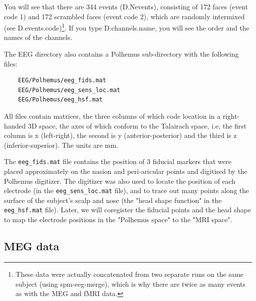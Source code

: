 You will see that there are 344 events (D.Nevents), consisting of 172 faces (event code 1) and 172 scrambled faces (event code 2), which are randomly intermixed (see D.events.code)\footnote{These data were actually concatenated from two separate runs on the same subject (using spm-eeg-merge), which is why there are twice as many events as with the MEG and fMRI data.}. If you type D.channels.name, you will see the order and the names of the channels.

The EEG directory also contains a Polhemus sub-directory with the following files:
\begin{verbatim}
	EEG/Polhemus/eeg_fids.mat
	EEG/Polhemus/eeg_sens_loc.mat
	EEG/Polhemus/eeg_hsf.mat
\end{verbatim}
All files contain matrices, the three columns of which code location in a right-handed 3D space, the axes of which conform to the Talairach space, i.e, the first column is x (left-right), the second is y (anterior-posterior) and the third is z (inferior-superior). The units are mm.

The \verb!eeg_fids.mat! file contains the position of 3 fiducial markers that were placed approximately on the nasion and peri-aricular points and digitised by the Polhemus digitizer. The digitizer was also used to locate the position of each electrode (in the \verb!eeg_sens_loc.mat! file), and to trace out many points along the surface of the subject's scalp and nose (the "head shape function" in the \verb!eeg_hsf.mat! file). Later, we will coregister the fiducial points and the head shape to map the electrode positions in the "Polhemus space" to the "MRI space".

\subsection{MEG data \label{meg}}

